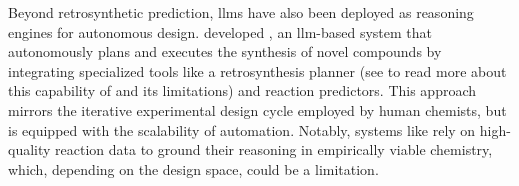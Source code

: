 Beyond retrosynthetic prediction, \glspl{llm} have also been deployed as reasoning engines for autonomous design. \textcite{bran2024augmenting} developed , an \gls{llm}-based system that autonomously plans and executes the synthesis of novel compounds by integrating specialized tools like a retrosynthesis planner (see  to read more about this capability of  and its limitations) and reaction predictors. This approach mirrors the iterative experimental design cycle employed by human chemists, but is equipped with the scalability of automation. Notably, systems like  rely on high-quality reaction data to ground their reasoning in empirically viable chemistry, which, depending on the design space, could be a limitation.


